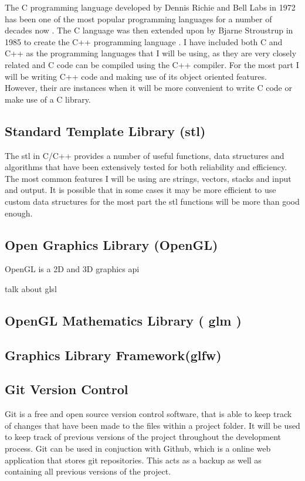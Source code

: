 The C programming language developed by Dennis Richie and Bell Labs in 1972 has been one of the most popular programming languages for a number of decades now \cite{ritchie1975c}. The C language was then extended upon by Bjarne Stroustrup in 1985 to create the C++ programming language \cite{stroustrup2000c++}. I have included both C and C++ as the programming languages that I will be using, as they are very closely related and C code can be compiled using the C++ compiler. For the most part I will be writing C++ code and making use of its object oriented features. However, their are instances when it will be more convenient to write C code or make use of a C library. 

\subsection{Standard Template Library (\acrshort{stl})}

The \acrshort{stl} in C/C++ provides a number of useful functions, data structures and algorithms that have been extensively tested for both reliability and efficiency. The most common features I will be using are strings, vectors, stacks and input and output. It is possible that in some cases it may be more efficient to use custom data structures for the most part the \acrshort{stl} functions will be more than good enough. \cite{horton2015stl} 

\subsection{Open Graphics Library (OpenGL)}

\gls{OpenGL} is a 2D and 3D graphics \acrshort{api}

talk about \acrshort{glsl}
\cite{movania2017opengl}

\subsection{OpenGL Mathematics Library ( \acrshort{glm} )}

\subsection{Graphics Library Framework(\acrshort{glfw})}

\subsection{Git Version Control}
Git is a free and open source version control software, that is able to keep track of changes that have been made to the files within a project folder. It will be used to keep track of previous versions of the project throughout the development process. Git can be used in conjuction with Github, which is a online web application that stores git repositories. This acts as a backup as well as containing all previous versions of the project.


